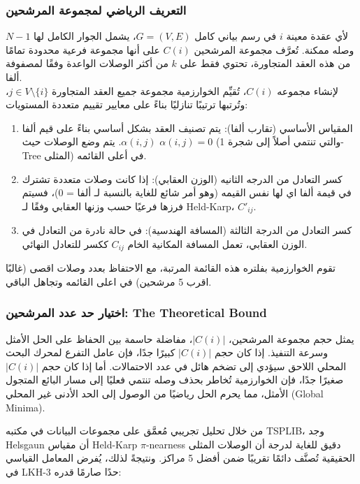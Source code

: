 \documentclass{article}
\newcommand{\en}[1]{\textenglish{#1}}
\begin{document}
\subsubsection{التعريف الرياضي لمجموعة المرشحين}
لأي عقدة معينة $i$ في رسم بياني كامل $G = (V, E)$، يشمل الجوار الكامل لها $N - 1$ وصله ممكنة. تُعرَّف مجموعة المرشحين $C(i)$ على أنها مجموعة فرعية محدودة تمامًا من هذه العقد المتجاورة، تحتوي فقط على $k$ من أكثر الوصلات الواعدة وفقًا لمصفوفة ألفا.\\

لإنشاء مجموعه $C(i)$، تُقيِّم الخوارزمية مجموعة جميع العقد المتجاورة $j \in V \setminus \{i\}$، وتُرتبها ترتيبًا تنازليًا بناءً على معايير تقييم متعددة المستويات:

	\begin{enumerate}
		\item المقياس الأساسي (تقارب ألفا):
يتم تصنيف العقد بشكل أساسي بناءً على قيم ألفا $\alpha(i,j)$. يتم وضع الوصلات حيث $\alpha(i,j) = 0$ (والتي تنتمي أصلاً إلى شجرة \en{1-Tree} المثلى) في أعلى القائمه.

		\item كسر التعادل من الدرجه الثانيه (الوزن العقابي):
إذا كانت وصلات متعددة تشترك في قيمة ألفا اي لها نفس القيمه (وهو أمر شائع للغاية بالنسبة لـ ألفا = 0)، فسيتم فرزها فرعيًا حسب وزنها العقابي وفقًا لـ
\en{Held-Karp}، $C'_{ij}$.

		\item كسر التعادل من الدرجة الثالثة (المسافة الهندسية):
في حالة نادرة من التعادل في الوزن العقابي، تعمل المسافة المكانية الخام $C_{ij}$ ككسر للتعادل النهائي.\\
	\end{enumerate}

تقوم الخوارزمية بفلتره هذه القائمة المرتبة، مع الاحتفاظ بعدد وصلات اقصى (غالبًا اقرب 5 مرشحين) في اعلى القائمه وتجاهل الباقي.

\subsubsection{اختيار حد عدد المرشحين: \en{The Theoretical Bound}}
يمثل حجم مجموعة المرشحين، $|C(i)|$، مفاضلة حاسمة بين الحفاظ على الحل الأمثل وسرعة التنفيذ. إذا كان حجم $|C(i)|$ كبيرًا جدًا، فإن عامل التفرع لمحرك البحث المحلي اللاحق سيؤدي إلى تضخم هائل في عدد الاحتمالات. أما إذا كان حجم $|C(i)|$ صغيرًا جدًا، فإن الخوارزمية تُخاطر بحذف وصله تنتمي فعليًا إلى مسار البائع المتجول الأمثل، مما يحرم الحل رياضيًا من الوصول إلى الحد الأدنى غير المحلي (\en{Global Minima}).

من خلال تحليل تجريبي مُعمَّق على مجموعات البيانات في مكتبه \en{TSPLIB}، وجد \en{Helsgaun} أن مقياس \en{Held-Karp $\pi$-nearness} دقيق للغاية لدرجة أن الوصلات المثلى الحقيقية تُصنَّف دائمًا تقريبًا ضمن أفضل 5 مراكز. ونتيجةً لذلك، يُفرض المعامل القياسي في LKH-3 حدًا صارمًا قدره:
\end{document}
